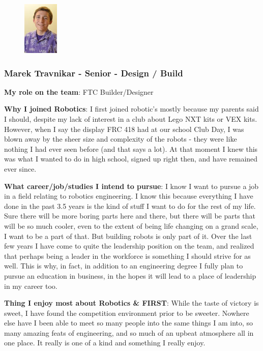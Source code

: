 \begin{figure}
	\centering
	\includegraphics[height=1in]{marek}
\end{figure}
\subsubsection{Marek Travnikar - Senior - Design / Build} 
{\bf My role on the team}: FTC Builder/Designer 

{\bf Why I joined Robotics}: I first joined robotic's mostly because my parents said I should, despite my lack of interest in a club about Lego NXT kits or VEX kits. However, when I say the display FRC 418 had at our school Club Day, I was blown away by the sheer size and complexity of the robots - they were like nothing I had ever seen before (and that says a lot). At that moment I knew this was what I wanted to do in high school, signed up right then, and have remained ever since.

{\bf What career/job/studies I intend to pursue}: I know I want to pursue a job in a field relating to robotics engineering. I know this because everything I have done in the past 3.5 years is the kind of stuff I want to do for the rest of my life. Sure there will be more boring parts here and there, but there will be parts that will be so much cooler, even to the extent of being life changing on a grand scale, I want to be a part of that.  But building robots is only part of it. Over the last few years I have come to quite the leadership position on the team, and realized that perhaps being a leader in the workforce is something I should strive for as well. This is why, in fact, in addition to an engineering degree I fully plan to pursue an education in business, in the hopes it will lead to a place of leadership in my career too.

{\bf Thing I enjoy most about Robotics \& FIRST}: While the taste of victory is sweet, I have found the competition environment prior to be sweeter. Nowhere else have I been able to meet so many people into the same things I am into, so many amazing feats of engineering, and so much of an upbeat atmosphere all in one place. It really is one of a kind and something I really enjoy. 

